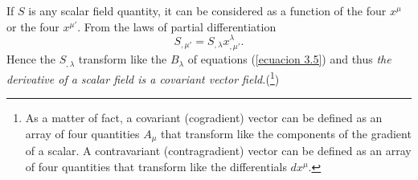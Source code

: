 If $S$ is any scalar field quantity, it can be considered as a function of the 
four $x^\mu$ or the four $x^{\mu'}$. From the laws of partial differentiation 
\[
    S_{,\mu'} = S_{,\lambda} x^{\lambda}_{,\mu'}.
\]
Hence the $S_{,\lambda}$ transform like the $B_{\lambda}$ of equations 
(\ref{ecuacion 3.5}) and thus \emph{the derivative of a scalar field is a 
covariant vector field.}(\footnote{As a matter of fact, a covariant 
(cogradient) vector can be defined as an array of four quantities $A_{\mu}$ that 
transform like the components of the gradient of a scalar.  A contravariant 
(contragradient) vector can be defined as an array of four quantities that 
transform like the differentials $dx^\mu$.})


